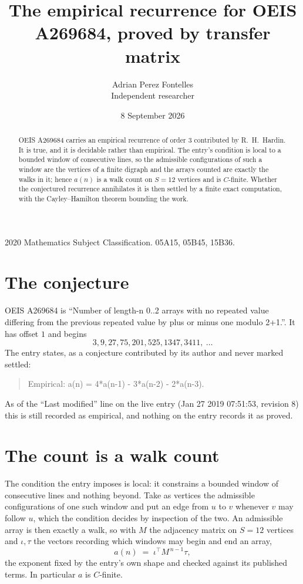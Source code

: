 \documentclass[11pt,a4paper]{article}
\title{The empirical recurrence for OEIS A269684, proved by transfer matrix}
\author{Adrian Perez Fontelles\\ \small Independent researcher}
\date{8 September 2026}
\theoremstyle{plain}
\theoremstyle{definition}
\begin{document}
\maketitle

\begin{abstract}
OEIS A269684 carries an empirical recurrence of order $3$ contributed by R.~H.~Hardin. It is
true, and it is decidable rather than empirical. The entry's condition is local to a bounded window of consecutive lines, so
the admissible configurations of such a window are the vertices of a finite digraph and the
arrays counted are exactly the walks in it; hence $a(n)$ is a walk count on $S=12$ vertices
and is $C$-finite. Whether the conjectured recurrence annihilates it is then settled by a
finite exact computation, with the Cayley--Hamilton theorem bounding the work.
\end{abstract}

\noindent\small 2020 Mathematics Subject Classification. 05A15, 05B45, 15B36.\normalsize

\section{The conjecture}

OEIS A269684 is ``Number of length-n 0..2 arrays with no repeated value differing from the previous repeated value by plus or minus one modulo 2+1.''. It has offset $1$ and begins
\[
3, 9, 27, 75, 201, 525, 1347, 3411,\ \dots
\]
The entry states, as a conjecture contributed by its author and never marked settled:
\begin{quote}
Empirical: a(n) = 4*a(n-1) - 3*a(n-2) - 2*a(n-3).
\end{quote}
As of the ``Last modified'' line on the live entry (Jan 27 2019 07:51:53, revision 8) this is still
recorded as empirical, and nothing on the entry records it as proved.

\section{The count is a walk count}

The condition the entry imposes is local: it constrains a bounded window of consecutive lines and nothing beyond. Take as
vertices the admissible configurations of one such window and put an edge from $u$ to $v$
whenever $v$ may follow $u$, which the condition decides by inspection of the two. An
admissible array is then exactly a walk, so with $M$ the adjacency matrix on $S=12$ vertices
and $\iota,\tau$ the vectors recording which windows may begin and end an array,
\[
a(n)\;=\;\iota^{\!\top}M^{\,n-1}\tau ,
\]
the exponent fixed by the entry's own shape and checked against its published terms. In
particular $a$ is $C$-finite.
\end{document}
